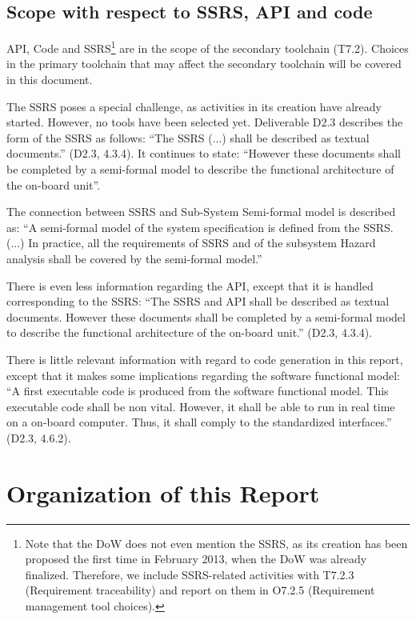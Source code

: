 \subsection{Scope with respect to SSRS, API and code}

API, Code and SSRS\footnote{Note that the DoW does not even mention the SSRS, as its creation has been proposed the first time in February 2013, when the DoW was already finalized.  Therefore, we include SSRS-related activities with T7.2.3 (Requirement traceability) and report on them in O7.2.5 (Requirement management tool choices).}  are in the scope of the secondary toolchain (T7.2).  Choices in the primary toolchain that may affect the secondary toolchain will be covered in this document.

The SSRS poses a special challenge, as activities in its creation have already started.  However, no tools have been selected yet.  Deliverable D2.3 \citep{D2_3} describes the form of the SSRS as follows:
``The SSRS (...) shall be described as textual documents.'' (D2.3, 4.3.4).  It continues to state: ``However these documents shall be completed by a semi-formal model to describe the functional architecture of the on-board unit''.

The connection between SSRS and Sub-System Semi-formal model is described as: ``A semi-formal model of the system specification is defined from the SSRS. (...) In practice, all the requirements of SSRS and of the subsystem Hazard analysis shall be covered by the semi-formal model.''

There is even less information regarding the API, except that it is handled corresponding to the SSRS: ``The SSRS and API shall be described as textual documents. However these documents shall be completed by a semi-formal model to describe the functional architecture of the on-board unit.'' (D2.3, 4.3.4).

There is little relevant information with regard to code generation in this report, except that it makes some implications regarding the software functional model: ``A first executable code is produced from the software functional model.  This executable code shall be non vital. However, it shall be able to run in real time on a on-board computer.  Thus, it shall comply to the standardized interfaces.'' (D2.3, 4.6.2).

\section{Organization of this Report}

